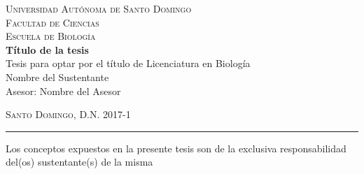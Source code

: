 \begin{titlepage}
\begin{center}
\setlength{\parindent}{0cm}

\textsc{\Large Universidad Autónoma de Santo Domingo\\
Facultad de Ciencias\\
Escuela de Biología\\}
\vspace{10ex}
{\huge\textbf{Título de la tesis}}\\[5ex]
{\large Tesis para optar por el título de Licenciatura en Biología}\\[10ex]
{\Large Nombre del Sustentante}\\[10ex] %
{\Large Asesor: Nombre del Asesor} %
\end{center}

\vspace*{\fill}
\noindent
\textsc{Santo Domingo, D.N. \hspace*{\fill} 2017-1}\\[1ex] %
\hrule
\vspace{2ex}
\noindent
Los conceptos expuestos en la presente tesis son de la
exclusiva responsabilidad del(os) sustentante(s) de la misma
\end{titlepage}
